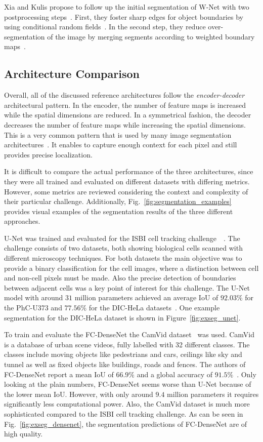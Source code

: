 Xia and Kulis propose to follow up the initial segmentation of W-Net with two postprocessing steps~\cite{wnet17}. First, they foster sharp edges for object boundaries by using conditional random fields~\cite{crf17}. In the second step, they reduce over-segmentation of the image by merging segments according to weighted boundary maps~\cite{hierarchy_imgseg11}.

\subsection{Architecture Comparison}
Overall, all of the discussed reference architectures follow the \emph{encoder-decoder} architectural pattern. In the encoder, the number of feature maps is increased while the spatial dimensions are reduced. In a symmetrical fashion, the decoder decreases the number of feature maps while increasing the spatial dimensions. This is a very common pattern that is used by many image segmentation architectures~\cite{imseg_survey20}. It enables to capture enough context for each pixel and still provides precise localization.

It is difficult to compare the actual performance of the three architectures, since they were all trained and evaluated on different datasets with differing metrics. However, some metrics are reviewed considering the context and complexity of their particular challenge. Additionally, Fig.~\ref{fig:segmentation_examples} provides visual examples of the segmentation results of the three different approaches.

U-Net was trained and evaluated for the ISBI cell tracking challenge~\cite{isbi_challenge_online}~\cite{isbi_challenge15}. The challenge consists of two datasets, both showing biological cells scanned with different microscopy techniques. For both datasets the main objective was to provide a binary classification for the cell images, where a distinction between cell and non-cell pixels must be made. Also the precise detection of boundaries between adjacent cells was a key point of interest for this challenge. The U-Net model with around $31$ million parameters achieved an average IoU of $92.03\%$ for the PhC-U373 and $77.56\%$ for the DIC-HeLa datasets~\cite{unet15}. One example segmentation for the DIC-HeLa dataset is shown in Figure~\ref{fig:exseg_unet}.

To train and evaluate the FC-DenseNet the CamVid dataset~\cite{camvid_challenge08} was used. CamVid is a database of urban scene videos, fully labelled with 32 different classes. The classes include moving objects like pedestrians and cars, ceilings like sky and tunnel as well as fixed objects like buildings, roads and fences. The authors of FC-DenseNet report a mean IoU of $66.9\%$ and a global accuracy of $91.5\%$~\cite{denseseg17}. Only looking at the plain numbers, FC-DenseNet seems worse than U-Net because of the lower mean IoU. However, with only around $9.4$ million parameters it requires significantly less computational power. Also, the CamVid dataset is much more sophisticated compared to the ISBI cell tracking challenge. As can be seen in Fig.~\ref{fig:exseg_densenet}, the segmentation predictions of FC-DenseNet are of high quality.


